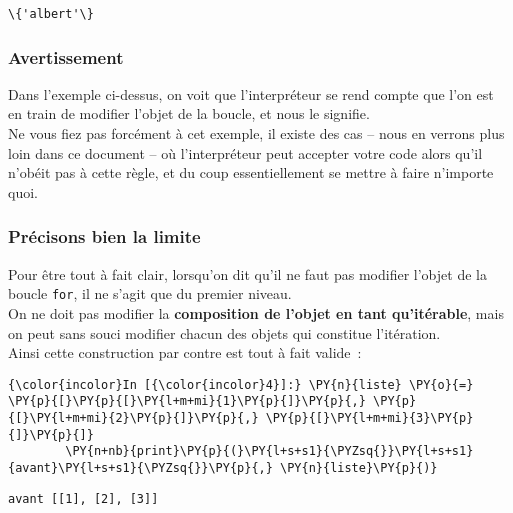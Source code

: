     \begin{Verbatim}[commandchars=\\\{\}]
\{'albert'\}

    \end{Verbatim}

    \hypertarget{avertissement}{%
\subsubsection{Avertissement}\label{avertissement}}

    Dans l'exemple ci-dessus, on voit que l'interpréteur se rend compte que
l'on est en train de modifier l'objet de la boucle, et nous le signifie.\\

Ne vous fiez pas forcément à cet exemple, il existe des cas -- nous en
verrons plus loin dans ce document -- où l'interpréteur peut accepter
votre code alors qu'il n'obéit pas à cette règle, et du coup
essentiellement se mettre à faire n'importe quoi.

    \hypertarget{pruxe9cisons-bien-la-limite}{%
\subsubsection{Précisons bien la
limite}\label{pruxe9cisons-bien-la-limite}}

    Pour être tout à fait clair, lorsqu'on dit qu'il ne faut pas modifier
l'objet de la boucle \texttt{for}, il ne s'agit que du premier niveau.\\

On ne doit pas modifier la \textbf{composition de l'objet en tant
qu'itérable}, mais on peut sans souci modifier chacun des objets qui
constitue l'itération.\\

Ainsi cette construction par contre est tout à fait valide~:

    \begin{Verbatim}[commandchars=\\\{\}]
{\color{incolor}In [{\color{incolor}4}]:} \PY{n}{liste} \PY{o}{=} \PY{p}{[}\PY{p}{[}\PY{l+m+mi}{1}\PY{p}{]}\PY{p}{,} \PY{p}{[}\PY{l+m+mi}{2}\PY{p}{]}\PY{p}{,} \PY{p}{[}\PY{l+m+mi}{3}\PY{p}{]}\PY{p}{]}
        \PY{n+nb}{print}\PY{p}{(}\PY{l+s+s1}{\PYZsq{}}\PY{l+s+s1}{avant}\PY{l+s+s1}{\PYZsq{}}\PY{p}{,} \PY{n}{liste}\PY{p}{)}
\end{Verbatim}


    \begin{Verbatim}[commandchars=\\\{\}]
avant [[1], [2], [3]]

    \end{Verbatim}

